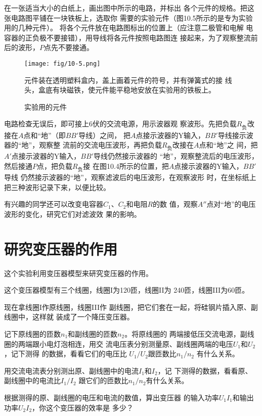 在一张适当大小的白纸上，画出图中所示的电路，并标出
各个元件的规格。把这张电路图平铺在一块铁板上，选取你
需要的实验元件（图10.5所示的是专为实验用的几种元件）。
将各个元件放在电路图标出的位置上（应注意二极管和电解
电容器的正负极不要接错），用导线将各元件按照电路图连
接起来，为了观察整流前后的波形，$P$点先不要接通。

\begin{figure}[htp]\centering
    \texttt{[image: fig/10-5.png]}

    元件装在透明塑料盒内，盖上画着元件的符号，并有弹簧式的接
线头，盒底有块磁铁，使元件能平稳地安放在实验用的铁板上。
    \caption{实验用的元件}
    \end{figure}

电路检查无误后，即可接上6伏的交流电源，用示波器观
察波形。先把负载$R_{\text{负}}$改接在$A$点和“地”（即$BB'$导线）之间，
把$A$点接示波器的Y输入，$BB'$导线接示波器的“地”，观察整
流前的交流电压波形，再把负载$R_{\text{负}}$改接在$A$点和“地”之
间，把$A'$点接示波器的Y输入，$BB'$导线仍然接示波器的
“地”，观察整流后的电压波形，然后接通$P$点，把负载$R_{\text{负}}$接
在图10.4所示的位置，把$A$点接示波器的Y输入，$BB'$导线
仍然接示波器的“地”，观察滤波后的电压波形，在观察波形
时，在坐标纸上把三种波形记录下来，以便比较。

有兴趣的同学还可以改变电容器$C_1$、$C_2$和电阻$R$的数
值，观察$A''$点对“地”的电压波形的变化，研究它们对滤波效
果的影响。

\section{研究变压器的作用}
这个实验利用变压器模型来研究变压器的作用。

这个变压器模型有三个线圈，线圈I为120匝，线圈II为
240匝，线圈III为60匝。

现在拿线圈I作原线圈，线圈III作
副线圈，把它们套在一起，将硅钢片插入原、副线圈中，这样就
装成了一个降压变压器。

记下原线圈的匝数$n_1$和副线圈的匝数$n_2$。将原线圈的
两端接低压交流电源，副线圈的两端跟小电灯泡相连，用交
流电压表分别测量原、副线圈两端的电压$U_1$和$U_2$，记下测得
的数据，看看它们的电压比
$U_1/U_2$跟匝数比$n_1/n_2$
有什么关系。

用交流电流表分别测出原、副线圈中的电流$I_1$和$I_2$，记
下测得的数据，看看原、副线圈中的电流比$I_1/I_2$
跟它们的匝数比$n_1/n_2$有什么关系。

根据测得的原、副线圈的电压和电流的数值，算出变压器
的输入功率$U_1I_1$和输出功率$U_2I_2$，你这个变压器的效率是
多少？

